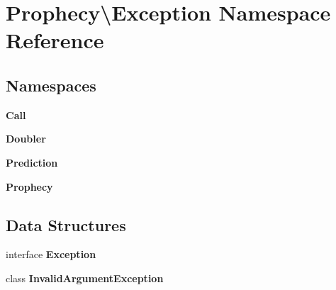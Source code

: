 \section{Prophecy\textbackslash{}Exception Namespace Reference}
\label{namespace_prophecy_1_1_exception}
\subsection*{Namespaces}
\begin{DoxyCompactItemize}
\item 
 {\bf Call}
\item 
 {\bf Doubler}
\item 
 {\bf Prediction}
\item 
 {\bf Prophecy}
\end{DoxyCompactItemize}
\subsection*{Data Structures}
\begin{DoxyCompactItemize}
\item 
interface {\bf Exception}
\item 
class {\bf Invalid\+Argument\+Exception}
\end{DoxyCompactItemize}
